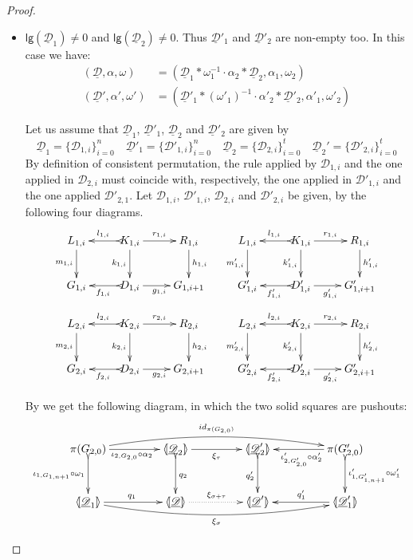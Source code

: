 \documentclass[a4paper,UKenglish,cleveref,pdftex, thm-restate,numberwithinsect]{lipics}
\newcommand{\id}[1]{\mathsf{id}_{#1}}
\newcommand{\dder}[1]{\mathscr{#1}}
\newcommand{\der}[1]{\underline{\dder{#1}}}
\newcommand{\lpro}{\langle \hspace{-1.85pt}[}
\newcommand{\rpro}{]\hspace{-1.85pt}\rangle}
\newcommand{\tpro}[1]{\lpro \der{#1}\rpro}
\newcommand{\lgh}[0]{\mathsf{lg}}
\begin{document}
\begin{proof}
\begin{itemize}
\item  $\lgh(\der{D}_1)\neq0$ and $\lgh(\der{D}_2)\neq 0$. Thus $\der{D}'_1$ and $\der{D}'_2$ are non-empty too. In this case we have:
\begin{align*}
	(\der{D}, \alpha, \omega)&=(\der{D}_1*\omega_1^{-1}\cdot \alpha_2*\der{D}_2, \alpha_1, \omega_2)\\
	(\der{D}', \alpha', \omega')&=(\der{D}'_1*(\omega'_1)^{-1}\cdot \alpha'_2*\der{D}'_2, \alpha'_1, \omega'_2)
\end{align*}

Let us assume that $\der{D}_1$, $\der{D}'_1$, $\der{D}_2$ and $\der{D}'_2$ are given by
\[\der{D}_1=\{\dder{D}_{1,i}\}_{i=0}^n \quad \der{D}'_1=\{\dder{D}'_{1,i}\}_{i=0}^n \quad \der{D}_2=\{\dder{D}_{2,i}\}_{i=0}^t \quad \der{D}_2'=\{\dder{D}'_{2,i}\}_{i=0}^t\]
By definition of consistent permutation, the rule applied by $\dder{D}_{1,i}$ and the one applied in $\dder{D}_{2,i}$  must coincide with, respectively, the one applied in $\dder{D}'_{1,i}$ and the one applied $\dder{D}'_{2,1}$. Let $\dder{D}_{1,i}$, $\dder{D}'_{1,i}$, $\dder{D}_{2,i}$ and $\dder{D}'_{2,i}$ be given, by the following four diagrams. 
\[\xymatrix{L_{1,i} \ar[d]_{m_{1, i}}& K_{1,i} \ar[d]_{k_{1, i}} \ar[r]^{r_{1,i}} \ar@{>->}[l]_{l_{1,i}} & R_{1,i}\ar[d]^{h_{1, i}} &L_{1,i} \ar[d]_{m'_{1, i}}& K_{1,i} \ar[d]_{k'_{1, i}} \ar[r]^{r_{1,i}} \ar@{>->}[l]_{l_{1,i}} & R_{1,i}\ar[d]^{h'_{1, i}} \\G_{1,i} & D_{1,i} \ar[r]_{g_{1,i}} \ar@{>->}[l]^{f_{1,i}} & G_{1,i+1} & G'_{1,i} & D'_{1,i}\ar[r]_{g'_{1,i}} \ar@{>->}[l]^{f'_{1,i}}  & G'_{1,i+1}}\]		
\[\xymatrix{L_{2,i} \ar[d]_{m_{2, i}}& K_{2,i} \ar[d]_{k_{2, i}} \ar[r]^{r_{2,i}} \ar@{>->}[l]_{l_{2,i}} & R_{2,i}\ar[d]^{h_{2, i}} &L_{2,i} \ar[d]_{m'_{2, i}}& K_{2,i} \ar[d]_{k'_{2, i}} \ar[r]^{r_{2,i}} \ar@{>->}[l]_{l_{2,i}} & R_{2,i}\ar[d]^{h'_{2, i}} \\G_{2,i} & D_{2,i} \ar[r]_{g_{2,i}} \ar@{>->}[l]^{f_{2,i}} & G_{2,i+1} & G'_{2,i} & D'_{2,i}\ar[r]_{g'_{2,i}} \ar@{>->}[l]^{f'_{2,i}}  & G'_{2,i+1}}\] 

By  we get the following diagram, in which the two solid squares are pushouts:
\[\xymatrix@C=45pt@R=30pt{\pi(G_{2,0}) \ar@/^.4cm/[rrr]^{\id{\pi(G_{2,0})}}\ar@{>->}[d]_{\iota_{1, G_{1,n+1}} \circ \omega_1}\ar[r]_{\iota_{2, G_{2,0}} \circ \alpha_2}& \lpro \der{D}_2 \rpro \ar@{>->}[d]^{q_2}\ar[r]_{\xi_\tau} & \lpro \der{D}'_2 \rpro \ar@{>->}[d]_{q'_2} &\pi(G'_{2,0}) \ar@{>->}[d]^{\iota'_{1, G'_{1,n+1}} \circ \omega'_1} \ar[l]^{\iota'_{2, G'_{2,0}} \circ \alpha'_2}\\ \lpro \der{D}_1 \rpro \ar@/_.4cm/[rrr]_{\xi_\sigma} \ar[r]^{q_1} & \tpro{D} \ar@{.>}[r]^{\xi_{\sigma+\tau}} & \lpro \der{D}'\rpro & \lpro \der{D}'_1\rpro  \ar[l]_{q'_1}}\]


\end{itemize}
\end{proof}
\end{document}
